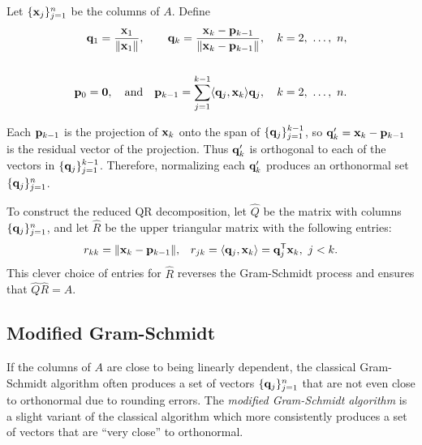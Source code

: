 Let $\{\mathbf{x}_j\}_{j=1}^n$ be the columns of $A$.
Define
%
\begin{align*}
\q_1 = \frac{\x_1}{\|\x_1\|},
&&
\q_{k} = \frac{\x_k - \p_{k-1}}{\|\x_k - \p_{k-1}\|},\quad k=2,\ \ldots,\ n,
\\ \\
\p_0 = \0,\quad \text{and}
&&
\p_{k-1} = \sum_{j=1}^{k-1} \langle \q_j, \x_k\rangle \q_j,\quad k=2,\ \ldots,\ n.
\end{align*}

Each $\mathbf{p}_{k-1}$ is the projection of $\mathbf{x}_k$ onto the span of $\{\mathbf{q}_j\}_{j=1}^{k-1}$, so $\mathbf{q}_k' = \mathbf{x}_k - \mathbf{p}_{k-1}$ is the residual vector of the projection.
Thus $\mathbf{q}_k'$ is orthogonal to each of the vectors in $\{\mathbf{q}_j\}_{j=1}^{k-1}$.
Therefore, normalizing each $\mathbf{q}_k'$ produces an orthonormal set $\{\mathbf{q}_j\}_{j=1}^n$.

To construct the reduced QR decomposition, let $\widehat{Q}$ be the matrix with columns $\{\mathbf{q}_j\}_{j=1}^n$, and let $\widehat{R}$ be the upper triangular matrix with the following entries:
%
\begin{align*}
r_{kk} = \|\mathbf{x}_k-\mathbf{p}_{k-1}\|,
&&
r_{jk} = \langle \mathbf{q}_j, \mathbf{x}_k\rangle = \mathbf{q}_j^{\mathsf T}\mathbf{x}_k,\ j < k.
\end{align*}
%
This clever choice of entries for $\widehat{R}$ reverses the Gram-Schmidt process and ensures that $\widehat{Q}\widehat{R} = A$.

\begin{comment}
To construct the full QR decomposition, choose $m - n$ vectors $\{\x_j\}_{j=n+1}^m$ such that the entire set of original vectors $\{\x_j\}_{j=1}^m$ is linearly independent, then continue the Gram-Schmidt process to produce the additional columns of $Q$.
Appending $m - n$ rows of zeros to $\widehat{R}$ results in $R$.
\end{comment}

\subsection*{Modified Gram-Schmidt} %

If the columns of $A$ are close to being linearly dependent, the classical Gram-Schmidt algorithm often produces a set of vectors $\{\mathbf{q}_j\}_{j=1}^n$ that are not even close to orthonormal due to rounding errors.
The \emph{modified Gram-Schmidt algorithm} is a slight variant of the classical algorithm which more consistently produces a set of vectors that are ``very close'' to orthonormal.

